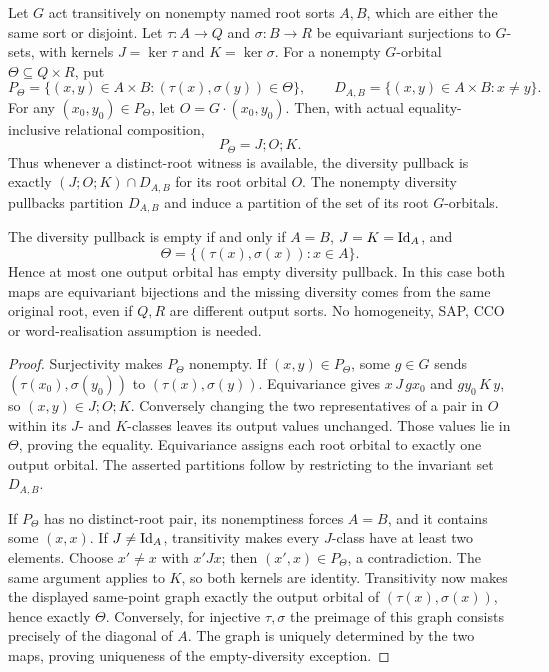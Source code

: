 \begin{lemma}
\label{lem:foundational-orbital-pullback}
Let $G$ act transitively on nonempty named root sorts $A,B$, which
are either the same sort or disjoint. Let $\tau:A\to Q$ and
$\sigma:B\to R$ be equivariant surjections to $G$-sets, with kernels
$J=\ker\tau$ and $K=\ker\sigma$. For a nonempty $G$-orbital
$\Theta\subseteq Q\times R$, put
\[
 P_\Theta=\{(x,y)\in A\times B:(\tau(x),\sigma(y))\in\Theta\},
 \qquad D_{A,B}=\{(x,y)\in A\times B:x\ne y\}.
\]
For any $(x_0,y_0)\in P_\Theta$, let $O=G\cdot(x_0,y_0)$.
Then, with actual equality-inclusive relational composition,
\[
                  P_\Theta=J;O;K.
\]
Thus whenever a distinct-root witness is available, the diversity
pullback is exactly $(J;O;K)\cap D_{A,B}$ for its root orbital $O$.
The nonempty diversity pullbacks partition $D_{A,B}$ and induce a
partition of the set of its root $G$-orbitals.

The diversity pullback is empty if and only if $A=B$,
$J=K=\mathrm{Id}_A$, and
\[
                \Theta=\{(\tau(x),\sigma(x)):x\in A\}.
\]
Hence at most one output orbital has empty diversity pullback. In
this case both maps are equivariant bijections and the missing
diversity comes from the same original root, even if $Q,R$ are
different output sorts. No homogeneity, SAP, CCO or word-realisation
assumption is needed.
\end{lemma}
\begin{proof}
Surjectivity makes $P_\Theta$ nonempty. If $(x,y)\in P_\Theta$,
some $g\in G$ sends $(\tau(x_0),\sigma(y_0))$ to
$(\tau(x),\sigma(y))$. Equivariance gives
$x\,J\,gx_0$ and $gy_0\,K\,y$, so $(x,y)\in J;O;K$.
Conversely changing the two representatives of a pair in $O$ within
its $J$- and $K$-classes leaves its output values unchanged. Those
values lie in $\Theta$, proving the equality. Equivariance assigns
each root orbital to exactly one output orbital. The asserted
partitions follow by restricting to the invariant set $D_{A,B}$.

If $P_\Theta$ has no distinct-root pair, its nonemptiness forces
$A=B$, and it contains some $(x,x)$. If $J\ne\mathrm{Id}_A$, transitivity
makes every $J$-class have at least two elements. Choose $x'\ne x$
with $x'Jx$; then $(x',x)\in P_\Theta$, a contradiction. The same
argument applies to $K$, so both kernels are identity. Transitivity
now makes the displayed same-point graph exactly the output orbital
of $(\tau(x),\sigma(x))$, hence exactly $\Theta$. Conversely, for
injective $\tau,\sigma$ the preimage of this graph consists precisely
of the diagonal of $A$. The graph is uniquely determined by the two
maps, proving uniqueness of the empty-diversity exception.
\end{proof}
